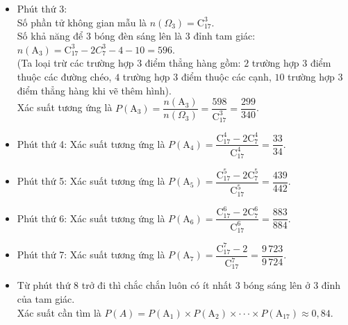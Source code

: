 \begin{ex}
{\begin{itemize}
    \item Phút thứ 3:\\
    Số phần tử không gian mẫu là $n\left(\Omega _3\right)=\mathrm{C}_{17}^3$.\\
    Số khả năng để $3$ bóng đèn sáng lên là $3$ đỉnh tam giác: $n\left(\mathrm{A}_3\right)=\mathrm{C}_{17}^3-2C_7^3-4-10=596$.\\
    (Ta loại trừ các trường hợp $3$ điểm thẳng hàng gồm: $2$ trường hợp $3$ điểm thuộc các đường chéo, $4$ trường hợp $3$ điểm thuộc các cạnh, $10$ trường hợp $3$ điểm thẳng hàng khi vẽ thêm hình).\\
    Xác suất tương ứng là $P\left(\mathrm{A}_3\right)=\dfrac{n\left(\mathrm{A}_3\right)}{n\left(\Omega _3\right)}=\dfrac{598}{\mathrm{C}_{17}^3}=\dfrac{299}{340}$.
    \item Phút thứ 4: Xác suất tương ứng là $P\left(\mathrm{A}_4\right)=\dfrac{\mathrm{C}_{17}^4-2\mathrm{C}_7^4}{\mathrm{C}_{17}^4}=\dfrac{33}{34}$.
    \item Phút thứ 5: Xác suất tương ứng là $P\left(\mathrm{A}_5\right)=\dfrac{\mathrm{C}_{17}^5-2\mathrm{C}_7^5}{\mathrm{C}_{17}^5}=\dfrac{439}{442}$.
    \item Phút thứ 6: Xác suất tương ứng là $P\left(\mathrm{A}_6\right)=\dfrac{\mathrm{C}_{17}^6-2\mathrm{C}_7^6}{\mathrm{C}_{17}^6}=\dfrac{883}{884}$.
    \item Phút thứ 7: Xác suất tương ứng là $P\left(\mathrm{A}_7\right)=\dfrac{\mathrm{C}_{17}^7-2}{\mathrm{C}_{17}^7}=\dfrac{9\,723}{9\,724}$.
    \item Từ phút thứ 8 trở đi thì chắc chắn luôn có ít nhất $3$ bóng sáng lên ở $3$ đỉnh của tam giác.\\
    Xác suất cần tìm là $P(A)=P\left(\mathrm{A}_1\right)\times P\left(\mathrm{A}_2\right)\times \cdot \cdot \cdot \times P\left(\mathrm{A}_{17}\right)\approx0{,}84$.
\end{itemize}
}
\end{ex}
